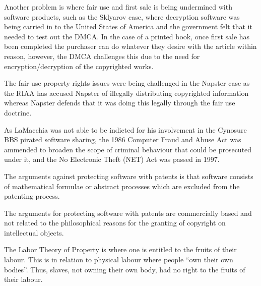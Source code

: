 Another problem is where fair use and first sale is being undermined with software products, such as the Sklyarov case, where decryption software was being carried in to the United States of America and the government felt that it needed to test out the DMCA. In the case of a printed book, once first sale has been completed the purchaser can do whatever they desire with the article within reason, however, the DMCA challenges this due to the need for encryption/decryption of the copyrighted works.



The fair use property rights issues were being challenged in the Napster case as the RIAA has accused Napster of illegally distributing copyrighted information whereas Napster defends that it was doing this legally through the fair use doctrine.



As LaMacchia was not able to be indicted for his involvement in the Cynosure BBS pirated software sharing, the 1986 Computer Fraud and Abuse Act was ammended to broaden the scope of criminal behaviour that could be prosecuted under it, and the No Electronic Theft (NET) Act was passed in 1997.



The arguments against protecting software with patents is that software consists of mathematical formulae or abstract processes which are excluded from the patenting process.

The arguments for protecting software with patents are commercially based and not related to the philosophical reasons for the granting of copyright on intellectual objects.





The Labor Theory of Property is where one is entitled to the fruits of their labour. This is in relation to physical labour where people ``own their own bodies''. Thus, slaves, not owning their own body, had no right to the fruits of their labour.

